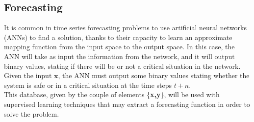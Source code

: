 

\subsection{Forecasting}
It is common in time series forecasting problems to use artificial neural networks (\glspl{ANN}) to find a solution, thanks to their capacity to learn an approximate mapping function from the input space to the output space. In this case, the \gls{ANN} will take as input the information from the network, and it will output binary values, stating if there will be or not a critical situation in the network. \\

\noindent Given the input $\textbf{x}$, the \gls{ANN} must output some binary values stating whether the system is safe or in a critical situation at the time steps $t+n$. \\

This database, given by the couple of elements \{\textbf{x,y}\}, will be used with supervised learning techniques that may extract a forecasting function in order to solve the problem. \\



